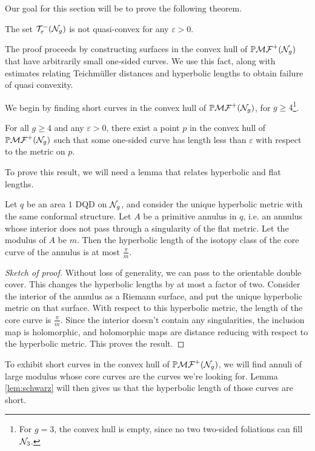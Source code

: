 \documentclass[12pt, reqno]{amsart}
\begin{document}
Our goal for this section will be to prove the following theorem.
\begin{theorem}
  \label{thm:qc-fail}
  The set $\mathcal{T}_{\varepsilon}^{-}(\mathcal{N}_g)$ is not quasi-convex for any $\varepsilon > 0$.
\end{theorem}
The proof proceeds by constructing surfaces in the convex hull of $\mathbb{P}\mathcal{MF}^+(\mathcal{N}_g)$ that have arbitrarily small one-sided curves.
We use this fact, along with estimates relating Teichm\"uller distances and hyperbolic lengths to obtain failure of quasi convexity.

We begin by finding short curves in the convex hull of $\mathbb{P}\mathcal{MF}^+(\mathcal{N}_g)$, for $g \geq 4$\footnote{For $g = 3$, the convex hull is empty, since no two two-sided foliations can fill $\mathcal{N}_3$.}.
\begin{proposition}
  \label{prop:very-short-curves}
  For all $g \geq 4$ and any $\varepsilon > 0$, there exist a point $p$ in the convex hull of $\mathbb{P}\mathcal{MF}^+(\mathcal{N}_g)$ such that some one-sided curve has length less than $\varepsilon$ with respect to the metric on $p$.
\end{proposition}

To prove this result, we will need a lemma that relates hyperbolic and flat lengths.
\begin{lemma}
  \label{lem:schwarz}
  Let $q$ be an area $1$ DQD on $\mathcal{N}_g$, and consider the unique hyperbolic metric with the same conformal structure.
  Let $A$ be a primitive annulus in $q$, i.e. an annulus whose interior does not pass  through a singularity of the flat metric.
  Let the modulus of $A$ be $m$.
  Then the hyperbolic length of the isotopy class of the core curve of the annulus is at most $\frac{\pi}{m}$.
\end{lemma}
\begin{proof}[Sketch of proof]
  Without loss of generality, we can pass to the orientable double cover.
  This changes the hyperbolic lengths by at most a factor of two.
  Consider the interior of the annulus as a Riemann surface, and put the unique hyperbolic metric on that surface.
  With respect to this hyperbolic metric, the length of the core curve is $\frac{\pi}{m}$. Since the interior doesn't contain any singularities, the inclusion map is holomorphic, and holomorphic maps are distance reducing with respect to the hyperbolic metric.
  This proves the result.
\end{proof}
To exhibit short curves in the convex hull of $\mathbb{P}\mathcal{MF}^+(\mathcal{N}_g)$, we will find annuli of large modulus whose core curves are the curves we're looking for.
Lemma \ref{lem:schwarz} will then gives us that the hyperbolic length of those curves are short.
\end{document}
